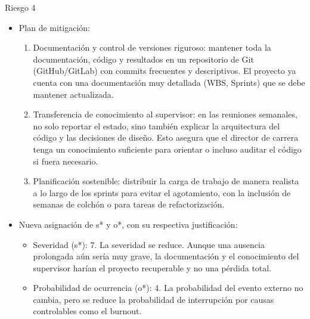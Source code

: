 \documentclass[
11pt, %
]{charter}
\begin{document}
Riesgo 4
\begin{itemize}
    \item Plan de mitigación:
    \begin{enumerate}
        \item Documentación y control de versiones riguroso: mantener toda la documentación, código y resultados en un repositorio de Git (GitHub/GitLab) con commits frecuentes y descriptivos. El proyecto ya cuenta con una documentación muy detallada (WBS, Sprints) que se debe mantener actualizada.
        \item Transferencia de conocimiento al supervisor: en las reuniones semanales, no solo reportar el estado, sino también explicar la arquitectura del código y las decisiones de diseño. Esto asegura que el director de carrera tenga un conocimiento suficiente para orientar o incluso auditar el código si fuera necesario.
        \item Planificación sostenible: distribuir la carga de trabajo de manera realista a lo largo de los sprints para evitar el agotamiento, con la inclusión de semanas de colchón o para tareas de refactorización.
    \end{enumerate}
    \item Nueva asignación de s* y o*, con su respectiva justificación:
    \begin{itemize}
        \item Severidad (s*): 7. La severidad se reduce. Aunque una ausencia prolongada aún sería muy grave, la documentación y el conocimiento del supervisor harían el proyecto recuperable y no una pérdida total.
        \item Probabilidad de ocurrencia (o*): 4. La probabilidad del evento externo no cambia, pero se reduce la probabilidad de interrupción por causas controlables como el burnout.
    \end{itemize}
\end{itemize}
\end{document}
